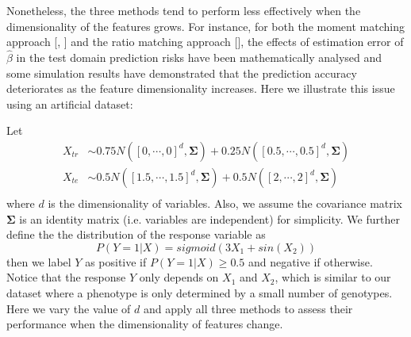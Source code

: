 \documentclass[a4paper,12pt]{article}
\begin{document}
Nonetheless, the three methods tend to perform less effectively when the dimensionality of the features grows. For instance, for both the moment matching approach [\cite{stojanov2019low}, \cite{yamada2013relative}] and the ratio matching approach [\cite{yamada2013relative}], the effects of estimation error of $\hat{\beta}$ in the test domain prediction risks have been mathematically analysed and some simulation results have demonstrated that the prediction accuracy deteriorates as the feature dimensionality increases. Here we illustrate this issue using an artificial dataset:

Let
\begin{align*}
X_{tr} & \sim 0.75 N\left([0,\cdots,0]^{d}, \boldsymbol{\Sigma} \right) + 0.25 N\left([0.5,\cdots,0.5]^{d}, \boldsymbol{\Sigma} \right)\\
X_{te} & \sim 0.5 N\left([1.5,\cdots,1.5]^{d}, \boldsymbol{\Sigma} \right) + 0.5 N\left([2,\cdots,2]^{d}, \boldsymbol{\Sigma} \right)\\
\end{align*}
where $d$ is the dimensionality of variables. Also, we assume the covariance matrix $\boldsymbol{\Sigma}$ is an identity matrix (i.e. variables are independent) for simplicity. We further define the the distribution of the response variable as $$P(Y = 1 | X) = sigmoid(3X_{1} + sin(X_{2}))$$ then we label $Y$ as positive if $P(Y = 1 | X) \geq 0.5$ and negative if otherwise. Notice that the response $Y$ only depends on $X_{1}$ and $X_{2}$, which is similar to our dataset where a phenotype is only determined by a small number of genotypes. Here we vary the value of $d$ and apply all three methods to assess their performance when the dimensionality of features change.
\end{document}
